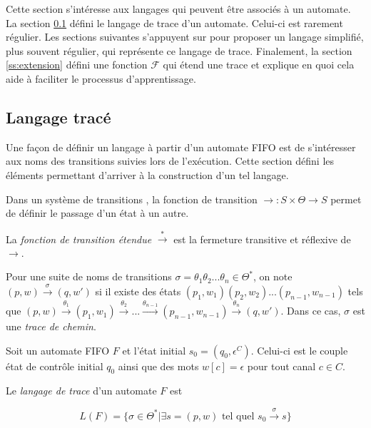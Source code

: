 Cette section s'intéresse aux langages qui peuvent être associés à un automate. La section \ref{ss:trace} défini le langage de trace d'un automate. Celui-ci est rarement régulier. Les sections suivantes s'appuyent sur \cite{Vardhan04} pour proposer un langage simplifié, plus souvent régulier, qui représente ce langage de trace. Finalement, la section \ref{ss:extension} défini une fonction $\mathcal{F}$ qui étend une trace et explique en quoi cela aide à faciliter le processus d'apprentissage.



\subsection{Langage tracé}\label{ss:trace}

Une façon de définir un langage à partir d'un automate FIFO est de s'intéresser aux noms des transitions suivies lors de l'exécution. Cette section défini les éléments permettant d'arriver à la construction d'un tel langage.

Dans un système de transitions \tsys, la fonction de transition $\rightarrow:S\times\Theta\rightarrow S$ permet de définir le passage d'un état à un autre.

La \emph{fonction de transition étendue} $\xrightarrow{*}$ est la fermeture transitive et réflexive de $\rightarrow$.

Pour une suite de noms de transitions $\sigma=\theta_1\theta_2 ...\theta_n\in\Theta^*$, on note $(p,w)\xrightarrow{\sigma}(q,w')$ si il existe des états $(p_1,w_1)(p_2,w_2)...(p_{n-1},w_{n-1})$ tels que $(p,w)\xrightarrow{\theta_1}(p_1,w_1)\xrightarrow{\theta_2}...\xrightarrow{\theta_{n-1}}(p_{n-1},w_{n-1})\xrightarrow{\theta_n}(q,w')$. Dans ce cas, $\sigma$ est une \emph{trace de chemin}.

\begin{definition} Soit un automate FIFO $F$ et l'état initial $s_0=(q_0, \epsilon^C)$. Celui-ci est le couple état de contrôle initial $q_0$ ainsi que des mots $w[c]=\epsilon$ pour tout canal $c\in C$.

  Le \emph{langage de trace} d'un automate $F$ est

  $$
  L(F)=\{\sigma\in\Theta^*|\exists s=(p,w) \text{ tel quel } s_0\xrightarrow{\sigma}s\}
  $$
\end{definition}

